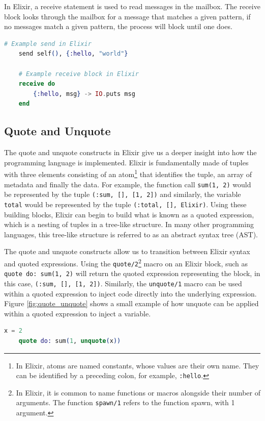 \par
In Elixir, a receive statement is used to read messages in the mailbox. The receive block looks through the mailbox for a message that matches a given pattern, if no messages match a given pattern, the process will block until one does.
\begin{lstlisting}[language=Elixir, xleftmargin=.4\linewidth, caption={An example of spawn/1 and spawn/4 in Elixir for spawning a new lightweight process and a new Elixir node}]
    # Example send in Elixir
    send self(), {:hello, "world"}

    # Example receive block in Elixir
    receive do
        {:hello, msg} -> IO.puts msg
    end
\end{lstlisting}
\subsection{Quote and Unquote}
The quote and unquote constructs in Elixir give us a deeper insight into how the programming language is implemented. Elixir is fundamentally made of tuples with three elements consisting of an atom\footnote{In Elixir, atoms are named constants, whose values are their own name. They can be identified by a preceding colon, for example, \texttt{:hello}.} that identifies the tuple, an array of metadata and finally the data. For example, the function call \texttt{sum(1, 2)} would be represented by the tuple \texttt{(:sum, [], [1, 2])} and similarly, the variable \texttt{total} would be represented by the tuple \texttt{(:total, [], Elixir)}. Using these building blocks, Elixir can begin to build what is known as a quoted expression, which is a nesting of tuples in a tree-like structure. In many other programming languages, this tree-like structure is referred to as an abstract syntax tree (AST).
\par
The quote and unquote constructs allow us to transition between Elixir syntax and quoted expressions. Using the \texttt{quote/2}\footnote{In Elixir, it is common to name functions or macros alongside their number of arguments. The function \texttt{spawn/1} refers to the function spawn, with 1 argument.} macro on an Elixir block, such as \texttt{quote do: sum(1, 2)} will return the quoted expression representing the block, in this case, \texttt{(:sum, [], [1, 2])}. Similarly, the \texttt{unquote/1} macro can be used within a quoted expression to inject code directly into the underlying expression. Figure \ref{fig:quote_unquote} shows a small example of how unquote can be applied within a quoted expression to inject a variable.
\begin{lstlisting}[language=Elixir, xleftmargin=.4\linewidth, caption={Elixir example of \texttt{quote/2} and \texttt{unquote/1}.}, label={fig:quote_unquote}]
    x = 2
    quote do: sum(1, unquote(x))
\end{lstlisting}
\par

